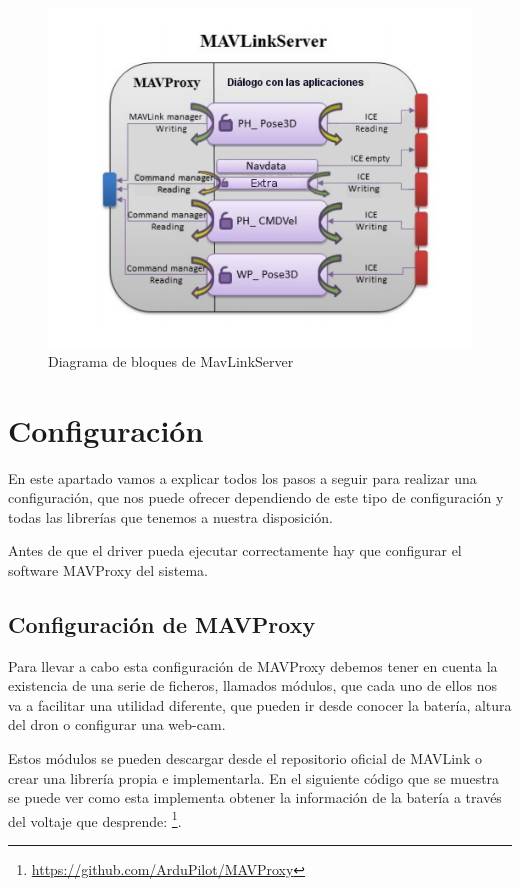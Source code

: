 \begin{figure}[H]
  \centering
  \includegraphics[scale=0.6]{imagenes/MavProxyPorDentro.png}
  \caption{Diagrama de bloques de MavLinkServer}
  \label{fig:MavProxyInside}
\end{figure}

\section{Configuración}

En este apartado vamos a explicar todos los pasos a seguir para realizar una configuración, que nos puede ofrecer dependiendo de este tipo de configuración y todas las librerías que tenemos a nuestra disposición.

Antes de que el driver pueda ejecutar correctamente hay que configurar el software MAVProxy del sistema.


\subsection{Configuración de MAVProxy}
\label{Pre-Configuracion}


Para llevar a cabo esta configuración de MAVProxy debemos tener en cuenta la existencia de una serie de ficheros, llamados módulos, que cada uno de ellos nos va a facilitar una utilidad diferente, que pueden ir desde conocer la batería, altura del dron o configurar una web-cam.

Estos módulos se pueden descargar desde el repositorio oficial de MAVLink o crear una librería propia e implementarla. En el siguiente código que se muestra se puede ver como esta implementa obtener la información de la batería a través del voltaje que desprende:
\footnote{\url{https://github.com/ArduPilot/MAVProxy}}.

